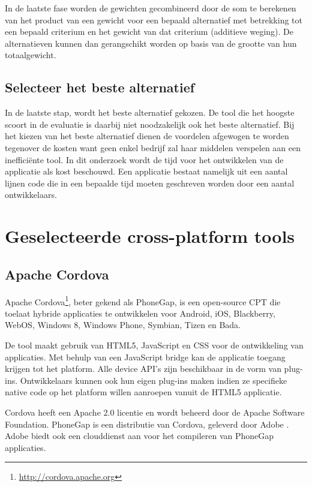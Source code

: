 \documentclass[a4paper]{IEEEconf}
\begin{document}
In de laatste fase worden de gewichten gecombineerd door de som te berekenen van het product van een gewicht voor een bepaald alternatief met betrekking tot een bepaald criterium en het gewicht van dat criterium (additieve weging). De alternatieven kunnen dan gerangschikt worden op basis van de grootte van hun totaalgewicht.

\subsection{Selecteer het beste alternatief}

In de laatste stap, wordt het beste alternatief gekozen. De tool die het hoogste scoort in de evaluatie is daarbij niet noodzakelijk ook het beste alternatief. Bij het kiezen van het beste alternatief dienen de voordelen afgewogen te worden tegenover de kosten want geen enkel bedrijf zal haar middelen verspelen aan een ineffici\"ente tool. In dit onderzoek wordt de tijd voor het ontwikkelen van de applicatie als kost beschouwd. Een applicatie bestaat namelijk uit een aantal lijnen code die in een bepaalde tijd moeten geschreven worden door een aantal ontwikkelaars.

\section{Geselecteerde cross-platform tools}

\subsection{Apache Cordova}

Apache Cordova\footnote{\url{http://cordova.apache.org}}, beter gekend als PhoneGap, is een open-source CPT die toelaat hybride applicaties te ontwikkelen voor Android, iOS, Blackberry, WebOS, Windows 8, Windows Phone, Symbian, Tizen en Bada.

De tool maakt gebruik van HTML5, JavaScript en CSS voor de ontwikkeling van applicaties. Met behulp van een JavaScript bridge kan de applicatie toegang krijgen tot het platform. Alle device API's zijn beschikbaar in de vorm van plug-ins. Ontwikkelaars kunnen ook hun eigen plug-ins maken indien ze specifieke native code op het platform willen aanroepen vanuit de HTML5 applicatie.

Cordova heeft een Apache 2.0 licentie en wordt beheerd door de Apache Software Foundation. PhoneGap is een distributie van Cordova, geleverd door Adobe \cite{LeRoux:2012}. Adobe biedt ook een clouddienst aan voor het compileren van PhoneGap applicaties. 
\end{document}

